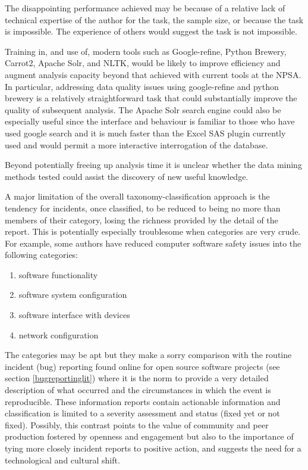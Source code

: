 The disappointing performance achieved may be because of a relative lack of technical expertise of the author for the task, the sample size, or because the task is impossible. The experience of others would suggest the task is not impossible.\cite{Ong2012} 

Training in, and use of, modern tools such as Google-refine, Python Brewery, Carrot2, Apache Solr, and NLTK, would be likely to improve efficiency and augment analysis capacity beyond that achieved with current tools at the NPSA. In particular, addressing data quality issues using google-refine and python brewery is a relatively straightforward task that could substantially improve the quality of subsequent analysis. The Apache Solr search engine could also be especially useful since the interface and behaviour is familiar to those who have used google search and it is much faster than the Excel SAS plugin currently used and would permit a more interactive interrogation of the database.
  
Beyond potentially freeing up analysis time it is unclear whether the data mining methods tested could assist the discovery of new useful knowledge. 

A major limitation of the overall taxonomy-classification approach is the tendency for incidents, once classified, to be reduced to being no more than members of their category, losing the richness provided by the detail of the report.\cite{Billings1998} This is potentially especially troublesome when categories are very crude. For example, some authors have reduced computer software safety issues into the following categories:\cite{Magrabi2012}
\begin{enumerate}
 \item software functionality
 \item software system configuration
 \item software interface with devices
 \item network configuration
\end{enumerate}

The categories may be apt but they make a sorry comparison with the routine incident (bug) reporting found online for open source software projects (see section \ref{bugreportinglit}) where it is the norm to provide a very detailed description of what occurred and the circumstances in which the event is reproducible. These information reports contain actionable information and classification is limited to a severity assessment and status (fixed yet or not fixed). Possibly, this contrast points to the value of community and peer production fostered by openness and engagement but also to the importance of tying more closely incident reports to positive action, and suggests the need for a technological and cultural shift.


